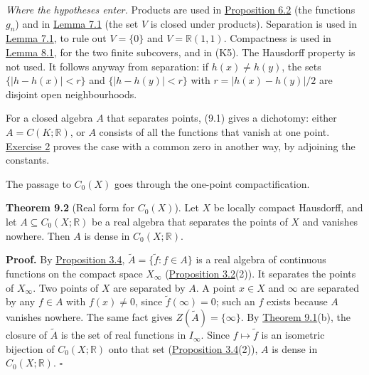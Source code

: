 \documentclass[
  english,
  11pt,
  a4paper,
]{article}
\begin{document}
\emph{Where the hypotheses enter.} Products are used in
\hyperlink{the-stone-weierstrass-theorem-for-functions-vanishing-at-infinity--oa-fnd-sw-04}{Proposition
6.2} (the functions \(g_n\)) and in
\hyperlink{the-stone-weierstrass-theorem-for-functions-vanishing-at-infinity--oa-fnd-sw-05}{Lemma
7.1} (the set \(V\) is closed under products). Separation is used in
\hyperlink{the-stone-weierstrass-theorem-for-functions-vanishing-at-infinity--oa-fnd-sw-05}{Lemma
7.1}, to rule out \(V=\{0\}\) and \(V=\mathbb R(1,1)\). Compactness is
used in
\hyperlink{the-stone-weierstrass-theorem-for-functions-vanishing-at-infinity--oa-fnd-sw-06}{Lemma
8.1}, for the two finite subcovers, and in (K5). The Hausdorff property
is not used. It follows anyway from separation: if \(h(x)\neq h(y)\),
the sets \(\{|h-h(x)|<r\}\) and \(\{|h-h(y)|<r\}\) with
\(r=|h(x)-h(y)|/2\) are disjoint open neighbourhoods.

For a closed algebra \(A\) that separates points, (9.1) gives a
dichotomy: either \(A=C(K;\mathbb R)\), or \(A\) consists of all the
functions that vanish at one point.
\hyperref[the-stone-weierstrass-theorem-for-functions-vanishing-at-infinity--exercises]{Exercise
2} proves the case with a common zero in another way, by adjoining the
constants.

The passage to \(C_0(X)\) goes through the one-point compactification.

\textbf{Theorem 9.2} (Real form for \(C_0(X)\)). Let \(X\) be locally
compact Hausdorff, and let \(A\subseteq C_0(X;\mathbb R)\) be a real
algebra that separates the points of \(X\) and vanishes nowhere. Then
\(A\) is dense in \(C_0(X;\mathbb R)\).

\textbf{Proof.} By
\hyperlink{the-stone-weierstrass-theorem-for-functions-vanishing-at-infinity--oa-fnd-sw-03}{Proposition
3.4}, \(\tilde A=\{\tilde f:f\in A\}\) is a real algebra of continuous
functions on the compact space \(X_\infty\)
(\hyperlink{the-stone-weierstrass-theorem-for-functions-vanishing-at-infinity--oa-fnd-sw-02}{Proposition
3.2}(2)). It separates the points of \(X_\infty\). Two points of \(X\)
are separated by \(A\). A point \(x\in X\) and \(\infty\) are separated
by any \(f\in A\) with \(f(x)\neq0\), since \(\tilde f(\infty)=0\); such
an \(f\) exists because \(A\) vanishes nowhere. The same fact gives
\(Z(\tilde A)=\{\infty\}\). By
\hyperlink{the-stone-weierstrass-theorem-for-functions-vanishing-at-infinity--oa-fnd-sw-07}{Theorem
9.1}(b), the closure of \(\tilde A\) is the set of real functions in
\(I_\infty\). Since \(f\mapsto\tilde f\) is an isometric bijection of
\(C_0(X;\mathbb R)\) onto that set
(\hyperlink{the-stone-weierstrass-theorem-for-functions-vanishing-at-infinity--oa-fnd-sw-03}{Proposition
3.4}(2)), \(A\) is dense in \(C_0(X;\mathbb R)\). \(\square\)
\end{document}
